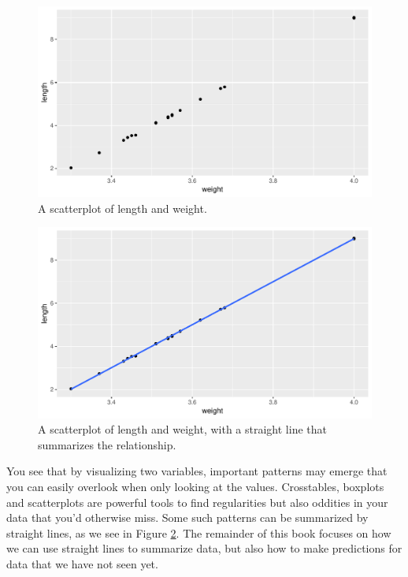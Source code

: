 \documentclass[]{report}\usepackage[]{graphicx}\usepackage[]{color}
\makeatletter
\def\maxwidth{ %
  \ifdim\Gin@nat@width>\linewidth
    \linewidth
  \else
    \Gin@nat@width
  \fi
}
\makeatother
\begin{document}
\begin{figure}

{\centering \includegraphics[width=\maxwidth]{figure/scatter_1-1} 

}

\caption[A scatterplot of length and weight]{A scatterplot of length and weight.}\label{fig:scatter_1}
\end{figure}



\begin{figure}

{\centering \includegraphics[width=\maxwidth]{figure/line_1-1} 

}

\caption[A scatterplot of length and weight, with a straight line that summarizes the relationship]{A scatterplot of length and weight, with a straight line that summarizes the relationship.}\label{fig:line_1}
\end{figure}



You see that by visualizing two variables, important patterns may emerge that you can easily overlook when only looking at the values. Crosstables, boxplots and scatterplots are powerful tools to find regularities but also oddities in your data that you'd otherwise miss. Some such patterns can be summarized by straight lines, as we see in Figure \ref{fig:line_1}. The remainder of this book focuses on how we can use straight lines to summarize data, but also how to make predictions for data that we have not seen yet. 
\end{document}
